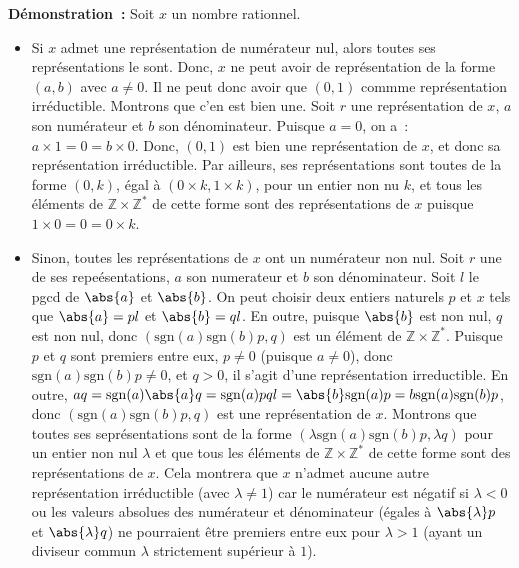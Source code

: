 \noindent\textbf{Démonstration :} Soit $x$ un nombre rationnel. 
\begin{itemize}[nosep]
    \item Si $x$ admet une représentation de numérateur nul, alors toutes ses représentations le sont.
        Donc, $x$ ne peut avoir de représentation de la forme $(a, b)$ avec $a \neq 0$.
        Il ne peut donc avoir que $(0, 1)$ commme représentation irréductible.
        Montrons que c'en est bien une. 
        Soit $r$ une représentation de $x$, $a$ son numérateur et $b$ son dénominateur. 
        Puisque $a = 0$, on a : $a \times 1 = 0 = b \times 0$. 
        Donc, $(0, 1)$ est bien une représentation de $x$, et donc sa représentation irréductible. 
        Par ailleurs, ses représentations sont toutes de la forme $(0, k)$, égal à $(0 \times k, 1 \times k)$, pour un entier non nu $k$, et tous les éléments de $\mathbb{Z} \times \mathbb{Z}^*$ de cette forme sont des représentations de $x$ puisque $1 \times 0 = 0 = 0 \times k$.
    \item Sinon, toutes les représentations de $x$ ont un numérateur non nul. 
        Soit $r$ une de ses repeésentations, $a$ son numerateur et $b$ son dénominateur. 
        Soit $l$ le pgcd de $\abs{a}$ et $\abs{b}$.
        On peut choisir deux entiers naturels $p$ et $x$ tels que $\abs{a} = p l$ et $\abs{b} = q l$.
        En outre, puisque $\abs{b}$ est non nul, $q$ est non nul, donc $(\mathrm{sgn}(a) \mathrm{sgn}(b) p, q)$ est un élément de $\mathbb{Z} \times \mathbb{Z}^*$. 
        Puisque $p$ et $q$ sont premiers entre eux, $p \neq 0$ (puisque $a \neq 0$), donc $\mathrm{sgn}(a) \mathrm{sgn}(b) p \neq 0$, et $q > 0$, il s'agit d'une représentation irreductible.
        En outre, $a q = \mathrm{sgn}(a) \abs{a} q = \mathrm{sgn}(a) p q l = \abs{b} \mathrm{sgn}(a) p = b \mathrm{sgn}(a) \mathrm{sgn}(b) p$, donc $(\mathrm{sgn}(a) \mathrm{sgn}(b) p, q)$ est une représentation de $x$.
        Montrons que toutes ses seprésentations sont de la forme $(\lambda \mathrm{sgn}(a) \mathrm{sgn}(b) p, \lambda q)$ pour un entier non nul $\lambda$ et que tous les éléments de $\mathbb{Z} \times \mathbb{Z}^*$ de cette forme sont des représentations de $x$.
        Cela montrera que $x$ n'admet aucune autre représentation irréductible (avec $\lambda \neq 1$) car le numérateur est négatif si $\lambda < 0$ ou les valeurs absolues des numérateur et dénominateur (égales à $\abs{\lambda} p$ et $\abs{\lambda} q$) ne pourraient être premiers entre eux pour $\lambda > 1$ (ayant un diviseur commun $\lambda$ strictement supérieur à $1$).
        \begin{itemize}[nosep]

\end{itemize}
\end{itemize}
